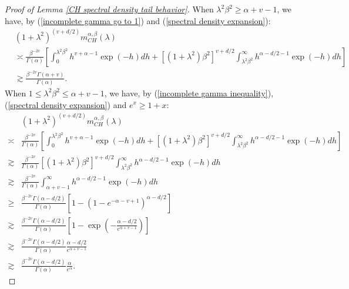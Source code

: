 \documentclass[10pt,a4paper]{amsart}
\begin{document}
\begin{proof}[Proof of Lemma \ref{CH spectral density tail behavior}]
When $ \lambda^2 \beta^{2} \geq \alpha+v-1 $, we have, by (\ref{incomplete gamma go to 1}) and (\ref{spectral density expansion}):
\begin{displaymath}
\begin{split}
&(1+\lambda^2)^{(v+d/2)}m^{\alpha,\beta}_{CH}(\lambda) \\
&\asymp \frac{\beta^{-2v}}{\Gamma(\alpha)} \left[\int_0^{\lambda^2\beta^2}  h^{v+\alpha-1} \exp(-h) dh
+[(1+\lambda^{2})\beta^{2}]^{v+d/2}\int_{\lambda^2\beta^2}^{\infty} h^{\alpha-d/2-1} \exp(-h) dh \right]\\
&\gtrsim \frac{\beta^{-2v}\Gamma(\alpha+v)}{\Gamma(\alpha)}.
\end{split}
\end{displaymath}
When $ 1\leq \lambda^2 \beta^{2} \leq \alpha+v-1 $, we have, by (\ref{incomplete gamma inequality}), (\ref{spectral density expansion})  and $e^x \ge 1+x$:
\begin{displaymath}
\begin{split}
&(1+\lambda^2)^{(v+d/2)}m^{\alpha,\beta}_{CH}(\lambda) \\
\asymp& \frac{\beta^{-2v}}{\Gamma(\alpha)} \left[\int_0^{\lambda^2\beta^2}  h^{v+\alpha-1} \exp(-h) dh
+[(1+\lambda^{2})\beta^{2}]^{v+d/2}\int_{\lambda^2\beta^2}^{\infty} h^{\alpha-d/2-1} \exp(-h) dh \right]\\
\gtrsim& \frac{\beta^{-2v}}{\Gamma(\alpha)}[(1+\lambda^{2})\beta^{2}]^{v+d/2}\int_{\lambda^2\beta^2}^{\infty} h^{\alpha-d/2-1} \exp(-h) dh\\
\gtrsim& \frac{\beta^{-2v}}{\Gamma(\alpha)}\int_{ \alpha+v-1}^{\infty} h^{\alpha-d/2-1} \exp(-h) dh\\
\geq& \frac{\beta^{-2v}\Gamma(\alpha-d/2)}{\Gamma(\alpha)}[1-(1-e^{- \alpha-v+1})^{\alpha-d/2}]\\
\gtrsim&\frac{\beta^{-2v}\Gamma(\alpha-d/2)}{\Gamma(\alpha)}\left[1-\exp\left(-{ \frac{\alpha-d/2}{e^{ \alpha+v-1}}}\right)\right]\\
\gtrsim& \frac{\beta^{-2v}\Gamma(\alpha-d/2)}{\Gamma(\alpha)}{ \frac{\alpha-d/2}{e^{ \alpha+v-1}}}\\
\gtrsim&\frac{\beta^{-2v}\Gamma(\alpha-d/2)}{\Gamma(\alpha)}\frac{\alpha}{e^\alpha}. 
\end{split}
\end{displaymath}
\end{proof}
\end{document}
